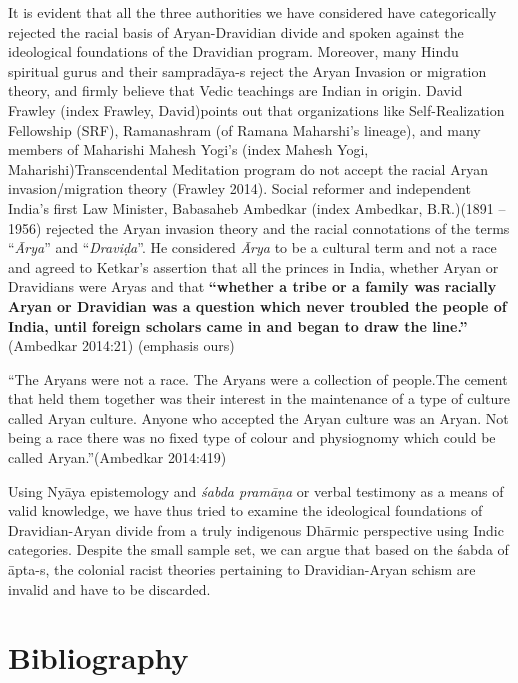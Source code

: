 It is evident that all the three authorities we have considered have categorically rejected the racial basis of Aryan-Dravidian divide and spoken against the ideological foundations of the Dravidian program. Moreover, many Hindu spiritual gurus and their sampradāya-s reject the Aryan Invasion or migration theory, and firmly believe that Vedic teachings are Indian in origin. David Frawley (index Frawley, David)points out that organizations like Self-Realization Fellowship (SRF), Ramanashram (of Ramana Maharshi’s lineage), and many members of Maharishi Mahesh Yogi’s (index Mahesh Yogi, Maharishi)Transcendental Meditation program do not accept the racial Aryan invasion/migration theory (Frawley 2014). Social reformer and independent India’s first Law Minister, Babasaheb Ambedkar (index Ambedkar, B.R.)(1891 – 1956) rejected the Aryan invasion theory and the racial connotations of the terms “\textit{Ārya}” and “\textit{Draviḍa}”. He considered \textit{Ārya} to be a cultural term and not a race and agreed to Ketkar’s assertion that all the princes in India, whether Aryan or Dravidians were Aryas and that \textbf{“whether a tribe or a family was racially Aryan or Dravidian was a question which never troubled the people of India, until foreign scholars came in and began to draw the line.”} (Ambedkar 2014:21) (emphasis ours)

\begin{myquote}
“The Aryans were not a race. The Aryans were a collection of people.The cement that held them together was their interest in the maintenance of a type of culture called Aryan culture. Anyone who accepted the Aryan culture was an Aryan. Not being a race there was no fixed type of colour and physiognomy which could be called Aryan.”(Ambedkar 2014:419)
\end{myquote}

Using Nyāya\textit{} epistemology and \textit{śabda pramāṇa} or verbal testimony as a means of valid knowledge, we have thus tried to examine the ideological foundations of Dravidian-Aryan divide from a truly indigenous Dhārmic perspective using Indic categories. Despite the small sample set, we can argue that based on the śabda of āpta-s, the colonial racist theories pertaining to Dravidian-Aryan schism are invalid and have to be discarded.


\section*{Bibliography}

